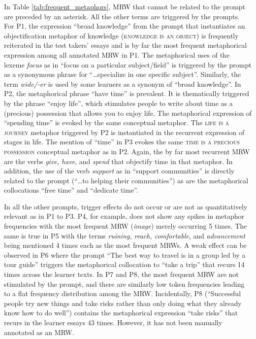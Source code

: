 \documentclass[11pt,a4paper]{article}
\begin{document}
In Table \ref{tab:frequent_metaphors}, MRW that cannot be related to the prompt are preceded by an asterisk. All the other terms are triggered by the prompts. For P1, the expression \enquote{broad knowledge} from the prompt that instantiates an objectification metaphor of knowledge (\textsc{knowledge is an object}) is frequently reiterated in the test takers’ essays and is by far the most frequent metaphorical expression among all annotated MRW in P1. The metaphorical uses of the lexeme \emph{focus} as in \enquote{focus on a particular subject/field} is triggered by the prompt as a synonymous phrase for \enquote{\ldots specialize in one specific subject}. Similarly, the term \emph{wide/-er} is used by some learners as a synonym of \enquote{broad knowledge}. In P2, the metaphorical phrase \enquote{have time} is prevalent. It is thematically triggered by the phrase \enquote{enjoy life}, which stimulates people to write about time as a (precious) possession that allows you to enjoy life. The metaphorical expression of \enquote{spending time} is evoked by the same conceptual metaphor. The \textsc{life is a journey} metaphor triggered by P2 is instantiated in the recurrent expression of stages in life. The mention of \enquote{time} in P3 evokes the same \textsc{time is a precious possession} conceptual metaphor as in P2. Again, the by far most recurrent MRW are the verbs \emph{give, have}, and \emph{spend} that objectify time in that metaphor. In addition, the use of the verb \emph{support} as in \enquote{support communities} is directly related to the prompt (\enquote{\ldots to helping their communities}) as are the metaphorical collocations \enquote{free time} and \enquote{dedicate time}. 

In all the other prompts, trigger effects do not occur or are not as quantitatively relevant as in P1 to P3. P4, for example, does not show any spikes in metaphor frequencies with the most frequent MRW (\emph{image}) merely occurring 5 times. The same is true in P5 with the terms \emph{ruining, reach, comfortable}, and \emph{advancement} being mentioned 4 times each as the most frequent MRWs. A weak effect can be observed in P6 where the prompt \enquote{The best way to travel is in a group led by a tour guide} triggers the metaphorical collocation to \enquote{take a trip} that recurs 14 times across the learner texts. In P7 and P8, the most frequent MRW are not stimulated by the prompt, and there are similarly low token frequencies leading to a flat frequency distribution among the MRW. Incidentally, P8 (\enquote{Successful people try new things and take risks rather than only doing what they already know how to do well}) contains the metaphorical expression \enquote{take risks} that recurs in the learner essays 43 times. However, it has not been manually annotated as an MRW.
\end{document}
